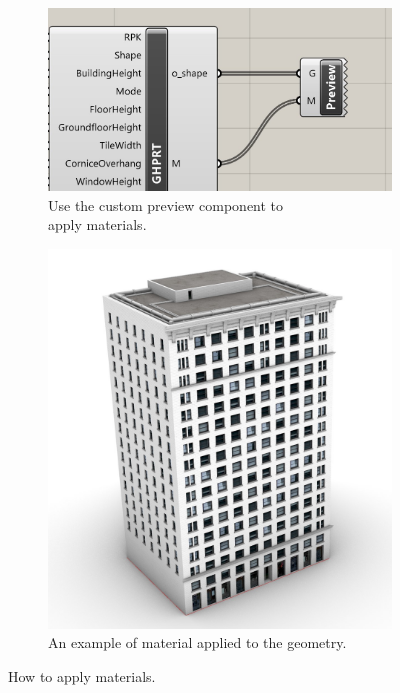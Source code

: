 \begin{figure}[h]
    \begin{subfigure}{0.5\textwidth}
        \includegraphics[width=0.9\linewidth]{res/man_gh_apply_material}
        \caption{Use the custom preview component to\\ apply materials.}
    \end{subfigure}
    \begin{subfigure}{0.5\textwidth}
        \includegraphics[width=0.9\linewidth]{res/man_gh_candler_result.jpg}
        \caption{An example of material applied to the geometry.}
    \end{subfigure}
        
    \caption{How to apply materials.}
    \label{fig:gh_material}    
\end{figure}

